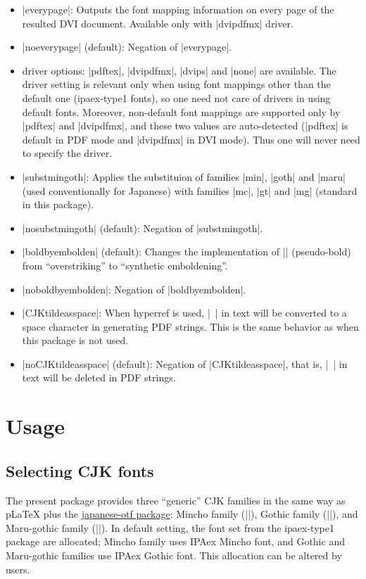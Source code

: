 \documentclass[a4paper]{article}
\newcommand{\Pkg}[1]{\textsf{#1}}
\newcommand{\Means}{:\hspace{1em plus 1em}}
\providecommand{\pLaTeX}{p\LaTeX}
\begin{document}
\begin{itemize}
\item |everypage|\Means
  Outputs the font mapping information on every page of the resulted
  DVI document.
  Available only with |dvipdfmx| driver.
\item |noeverypage| (default)\Means
  Negation of |everypage|.
\item driver options\Means
  |pdftex|, |dvipdfmx|, |dvips| and |none| are available.
  The driver setting is relevant only when using font mappings other
  than the default one (ipaex-type1 fonts), so one need not care of
  drivers in using default fonts.
  Moreover, non-default font mappings are supported only by |pdftex|
  and |dvipdfmx|, and these two values are auto-detected
  (|pdftex| is default in PDF mode and |dvipdfmx| in DVI mode).
  Thus one will never need to specify the driver.
\item |substmingoth|\Means
  Applies the substituion of families |min|, |goth| and |maru|
  (used conventionally for Japanese) with families |mc|, |gt| and |mg|
  (standard in this package).
\item |nosubstmingoth| (default)\Means
  Negation of |substmingoth|.
\item |boldbyembolden| (default)\Means
  Changes the implementation of |\CJKbold| (pseudo-bold) from
  ``overstriking'' to ``synthetic emboldening''.
\item |noboldbyembolden|\Means
  Negation of |boldbyembolden|.
\item |CJKtildeasspace|\Means
  When \Pkg{hyperref} is used, |~| in text will be converted
  to a space character in generating PDF strings.
  This is the same behavior as when this package is not used.
\item |noCJKtildeasspace| (default)\Means
  Negation of |CJKtildeasspace|, that is, |~| in text
  will be deleted in PDF strings.
\end{itemize}

\section{Usage}
\label{sec:usage}

\subsection{Selecting CJK fonts}

The present package provides three ``generic'' CJK families in the same
way as {\pLaTeX} plus the
\href{http://www.ctan.org/pkg/japanese-otf}{\Pkg{japanese-otf} package}:
Mincho family (|\mcfamily|), Gothic family (|\gtfamily|), and
Maru-gothic family (|\mgfamily|).
In default setting, the font set from the \Pkg{ipaex-type1} package
are allocated;
Mincho family uses IPAex Mincho font, and Gothic and Maru-gothic
families use IPAex Gothic font.
This allocation can be altered by users.
\end{document}
